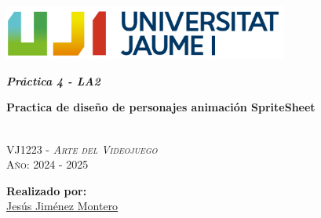 \documentclass[12pt]{article}
\begin{document}
\pagecolor{pageColor}
\color{textColor}
\begin{titlepage}
    \vspace*{\fill}

    \centering
    \parbox{0.8\textwidth}{    %
        \includegraphics[width=0.7\textwidth]{imgs/marca-uji-color-fons-transparent.png}\par\vspace{1cm}

        {\Huge \bfseries \textit{Práctica 4 - LA2} \par}
        {\Large \bfseries Practica de diseño de personajes animación SpriteSheet \par}

        \textsc{\large }
        \vspace{0.5cm} \\
        \textsc{\Large VJ1223 - \textit{Arte del Videojuego}}
        \vspace{0.5cm} \\
        \textsc{\large Año: 2024 - 2025}
        \vfill

        \textbf{Realizado por:}         \\
        \href{https://www.richardotomislav.com/}{Jesús Jiménez Montero}      \\
    }
    \vspace*{\fill}
\end{titlepage}

\hypertarget{toc}{}
\tableofcontents
\newpage

\listoffigures
\newpage
\end{document}

